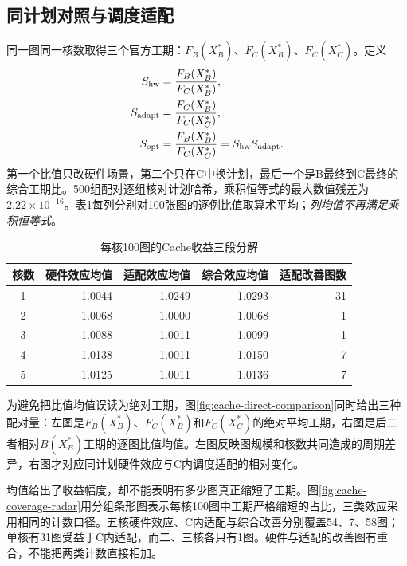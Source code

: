 \subsection{同计划对照与调度适配}
同一图同一核数取得三个官方工期：$F_B(X_B^*)$、$F_C(X_B^*)$、$F_C(X_C^*)$。定义
\begin{equation}
\begin{split}
S_{\rm hw}&=\frac{F_B(X_B^*)}{F_C(X_B^*)},\\
S_{\rm adapt}&=\frac{F_C(X_B^*)}{F_C(X_C^*)},\\
S_{\rm opt}&=\frac{F_B(X_B^*)}{F_C(X_C^*)}=S_{\rm hw}S_{\rm adapt}.
\end{split}
\label{eq:cache-factors}
\end{equation}
第一个比值只改硬件场景，第二个只在C中换计划，最后一个是B最终到C最终的综合工期比。500组配对逐组核对计划哈希，乘积恒等式的最大数值残差为$2.22\times10^{-16}$。表\ref{tab:cache-factors}每列分别对100张图的逐例比值取算术平均；\emph{列均值不再满足乘积恒等式}。
\begin{table}[H]\centering\caption{每核100图的Cache收益三段分解}\label{tab:cache-factors}
\begin{tabular}{crrrr}\toprule
核数 & 硬件效应均值 & 适配效应均值 & 综合效应均值 & 适配改善图数\\\midrule
1 & 1.0044 & 1.0249 & 1.0293 & 31\\
2 & 1.0068 & 1.0000 & 1.0068 & 1\\
3 & 1.0088 & 1.0011 & 1.0099 & 1\\
4 & 1.0138 & 1.0011 & 1.0150 & 7\\
5 & 1.0125 & 1.0011 & 1.0136 & 7\\\bottomrule
\end{tabular}\end{table}

为避免把比值均值误读为绝对工期，图\ref{fig:cache-direct-comparison}同时给出三种配对量：左图是$F_B(X_B^*)$、$F_C(X_B^*)$和$F_C(X_C^*)$的绝对平均工期，右图是后二者相对$B(X_B^*)$工期的逐图比值均值。左图反映图规模和核数共同造成的周期差异，右图才对应同计划硬件效应与C内调度适配的相对变化。

均值给出了收益幅度，却不能表明有多少图真正缩短了工期。图\ref{fig:cache-coverage-radar}用分组条形图表示每核100图中工期严格缩短的占比，三类效应采用相同的计数口径。五核硬件效应、C内适配与综合改善分别覆盖54、7、58图；单核有31图受益于C内适配，而二、三核各只有1图。硬件与适配的改善图有重合，不能把两类计数直接相加。

